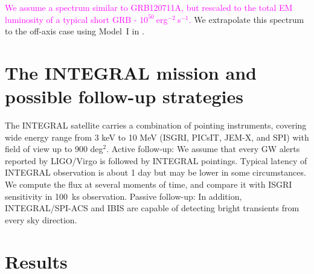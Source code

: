\documentclass[11pt]{article}
\begin{document}
\textcolor{magenta}{We assume a spectrum similar to GRB120711A, but rescaled to the total EM
luminosity of a typical short GRB - $10^{50}~$erg$^{-2}~$s$^{-1}$.} We extrapolate
this spectrum to the off-axis case using Model~I in \citep{2016arXiv160606124P}.

\section*{The INTEGRAL mission and possible follow-up strategies}


The INTEGRAL satellite carries a combination of pointing instruments, covering
wide energy range from 3 keV to 10 MeV (ISGRI, PICsIT, JEM-X, and SPI) with
field of view up to 900 deg$^2$. Active follow-up: We assume that every
GW alerts reported by LIGO/Virgo is followed by INTEGRAL pointings. Typical
latency of INTEGRAL observation is about 1 day but may be lower in some
circumstances. We compute the flux at several moments of time, and compare it
with ISGRI sensitivity in 100~ks observation. Passive follow-up: In
addition, INTEGRAL/SPI-ACS and IBIS are capable of detecting bright transients
from every sky direction.

\section*{Results}

\end{document}
